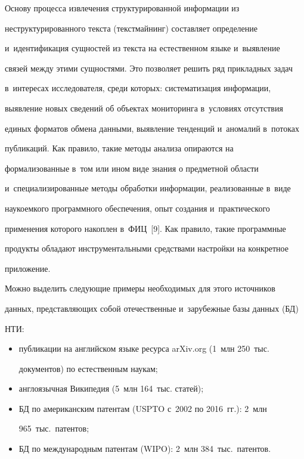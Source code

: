     Основу процесса извлечения структурированной информации из 

неструктурированного текста (текстмайнинг) составляет определение 

и~идентификация сущностей из текста на естественном языке и~выявление 

связей между этими сущностями. Это позволяет решить ряд прикладных задач 

в~интересах исследователя, среди которых: систематизация информации, 

выявление новых сведений об объектах мониторинга в~условиях отсутствия 

единых форматов обмена данными, выявление тенденций и~аномалий в~потоках 

публикаций. Как правило, такие методы анализа опираются на 

формализованные в~том или ином виде знания о предметной области 

и~специализированные методы обработки информации, реализованные в~виде 

наукоемкого программного обеспечения, опыт создания и~практического 

применения которого накоплен в~ФИЦ~[9]. Как правило, такие программные 

продукты обладают инструментальными средствами настройки на конкретное 

приложение.

    

    Можно выделить следующие примеры необходимых для этого источников 

данных, представляющих собой отечественные и~зарубежные базы данных (БД)  

НТИ:

    \begin{itemize}

\item публикации на английском языке ресурса arXiv.org (1~млн 250~тыс.\ 

документов) по естественным наукам;

\item англоязычная Википедия (5~млн 164~тыс. статей);

\item БД по американским патентам (USPTO с~2002 по 2016~гг.): 2~млн 

965~тыс.\ патентов;

\item БД по международным патентам (WIPO): 2~млн 384~тыс.\ патентов.

\end{itemize}



